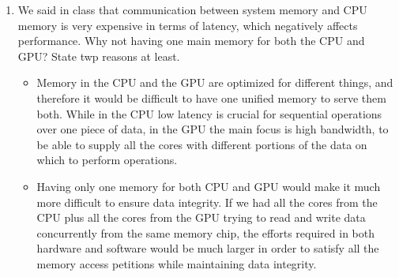 \documentclass{article}
\begin{document}
\begin{enumerate}[1.]
	\item We said in class that communication between system memory and CPU memory is very expensive in terms of latency, which negatively affects performance. Why not having one main memory for both the CPU and GPU? State twp reasons at least.
	\begin{itemize}
	    \item Memory in the CPU and the GPU are optimized for different things, and therefore it would be difficult to have one unified memory to serve them both. While in the CPU low latency is crucial for sequential operations over one piece of data, in the GPU the main focus is high bandwidth, to be able to supply all the cores with different portions of the data on which to perform operations.
	    \item Having only one memory for both CPU and GPU would make it much more difficult to ensure data integrity. If we had all the cores from the CPU plus all the cores from the GPU trying to read and write data concurrently from the same memory chip, the efforts required in both hardware and software would be much larger in order to satisfy all the memory access petitions while maintaining data integrity.  
	\end{itemize}

\end{enumerate}
\end{document}
